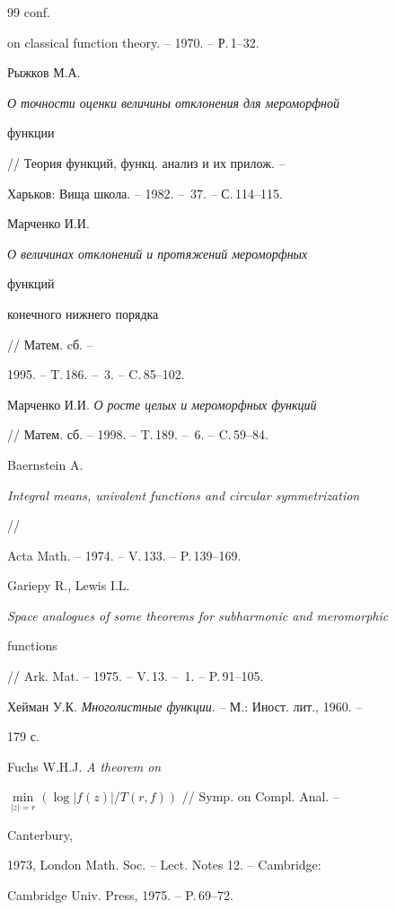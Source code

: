 \begin{thebibliography}{99}
conf. 


on classical function theory. -- 1970. -- Р.\,1--32. 




Рыжков М.А. {\em О точности оценки величины отклонения для мероморфной 


функции} // Теория функций, функц. анализ и их прилож. -- 


Харьков: Вища школа. -- 1982. -- \No\,37. -- С.\,114--115. 




Марченко И.И. {\em О величинах отклонений и протяжений мероморфных 


функций 


конечного нижнего порядка} // Матем. cб. -- 


1995. -- T.\,186. -- \No\,3. -- C.\,85--102. 




Марченко И.И. {\em О росте целых и мероморфных функций} 


// Матем. сб. -- 1998. -- T.\,189. -- \No\,6. -- C.\,59--84. 




Baernstein A. 


{\em Integral means, univalent functions and circular symmetrization} 


// 


Acta Math. -- 1974. -- V.\,133. -- P.\,139--169. 




Gariepy R., Lewis I.L. 


{\em Space analogues of some theorems for subharmonic and meromorphic 


functions} 


// Ark. Mat. -- 1975. -- V.\,13. -- \No\,1. -- P.\,91--105. 




Хейман У.К. {\em Многолистные функции}. -- М.: Иност. лит., 1960. -- 


179 с. 




Fuchs W.H.J. {\em A theorem on} 


$\min\limits_{|z|=r}(\log|f(z)|/T(r,f))$ // Symp. on Compl. Anal. -- 


Canterbury, 


1973, London Math. Soc. -- Lect. Notes 12. -- Cambridge: 


Cambridge Univ. Press, 1975. -- P.\,69--72. 



\end{thebibliography}
